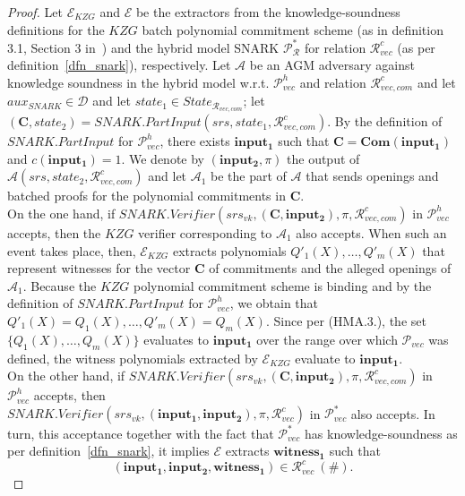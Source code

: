 \begin{proof} Let $\mathcal{E}_{\mathit{KZG}}$ and $\mathcal{E}$ be the extractors from the knowledge-soundness definitions for the 
$\mathit{KZG}$ batch polynomial commitment scheme (as in definition 3.1, Section 3 in~\cite{plonk}) and the hybrid model 
SNARK $\mathscr{P}^*_{\mathcal{R}}$ for relation $\mathcal{R}^c_{\mathit{vec}}$ (as per definition~\ref{dfn_snark}), respectively. 
Let $\mathcal{A}$ be an AGM adversary against knowledge soundness in the hybrid model w.r.t. 
$\mathscr{P}_{\mathit{vec}}^{h}$ and relation $\mathcal{R}_{\mathit{vec}, \mathit{com}}^c$ and let $\mathit{aux}_{\mathit{SNARK}} \in \mathcal{D}$ 
and let $\mathit{state_1} \in \mathit{State}_{\mathcal{R}_{\mathit{vec}, \mathit{com}}}$; let 
$(\mathbf{C},\mathit{state_2}) = \mathit{SNARK.PartInput}(\mathit{srs}, \mathit{state_1}, \mathcal{R}_{\mathit{vec}, \mathit{com}}^c)$. 
By the definition of $\mathit{SNARK.PartInput}$ for $\mathscr{P}_{\mathit{vec}}^{h}$, there exists 
$\mathbf{input_1}$ such that $\mathbf{C} = \mathbf{Com}(\mathbf{input_1})$ and $c(\mathbf{input_1}) = 1$. 
We denote by $(\mathbf{input_2}, \pi)$ the output of $\mathcal{A}(\mathit{srs}, \mathit{state_2},  \mathcal{R}_{\mathit{vec}, \mathit{com}}^c)$ 
and let $\mathcal{A}_1$ be the part of $\mathcal{A}$ that sends openings and batched proofs for the polynomial commitments in 
$\mathbf{C}$. \\

\noindent On the one hand, if $\mathit{SNARK.Verifier}(\mathit{srs}_{\mathit{vk}}, (\mathbf{C},\mathbf{input_2}),\pi,\mathcal{R}_{\mathit{vec}, \mathit{com}}^c)$ 
in $\mathscr{P}_{\mathit{vec}}^{h}$ accepts, then the $\mathit{KZG}$ verifier corresponding to 
$\mathcal{A}_1$ also accepts. When such an event takes place, then, \ewnp $\mathcal{E}_{\mathit{KZG}}$ extracts polynomials 
$Q'_1(X), \ldots, Q'_m(X)$ that represent witnesses for the vector $\mathbf{C}$ of commitments and the alleged openings of $\mathcal{A}_1$. 
Because the $\mathit{KZG}$ polynomial commitment scheme is binding and by the definition of 
$\mathit{SNARK.PartInput}$ for $\mathscr{P}_{\mathit{vec}}^{h}$, we obtain that $Q'_1(X) = Q_1(X), \ldots, Q'_m(X) = Q_m(X).$ 
Since per (HMA.3.), the set $\{Q_1(X), \ldots, Q_m(X)\}$ evaluates to $\mathbf{input_1}$ over the range over which $\mathscr{P}_{\mathit{vec}}$ 
was defined, \ewnp the witness polynomials extracted by $\mathcal{E}_{\mathit{KZG}}$ evaluate to $\mathbf{input_1}$. \\

\noindent On the other hand, if $\mathit{SNARK.Verifier}(\mathit{srs}_{\mathit{vk}}, (\mathbf{C},\mathbf{input_2}),\pi,\mathcal{R}_{\mathit{vec}, \mathit{com}}^c)$ 
in $\mathscr{P}_{\mathit{vec}}^{h}$ accepts, then \\
$\mathit{SNARK.Verifier}(\mathit{srs}_{\mathit{vk}}, (\mathbf{input_1},\mathbf{input_2}),\pi,\mathcal{R}_{\mathit{vec}}^c)$ 
in $\mathscr{P}_{\mathit{vec}}^{*}$ also accepts. In turn, this acceptance together with the fact that $\mathscr{P}_{\mathit{vec}}^{*}$ 
has knowledge-soundness as per definition~\ref{dfn_snark}, it implies $\mathcal{E}$ \ewnp extracts $\mathbf{witness_1}$ 
such that $$(\mathbf{input_1}, \mathbf{input_2}, \mathbf{witness_1}) \in \mathcal{R}_{\mathit{vec}}^{c} \ (\#).$$ 


\end{proof}
